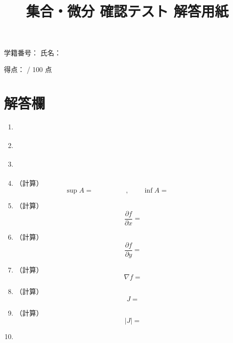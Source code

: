 \documentclass[uplatex,a4paper,12pt]{jsarticle}
\begin{document}
\title{集合・微分 確認テスト 解答用紙}
\author{}
\date{}
\maketitle

\noindent
学籍番号：\underline{\hspace{5cm}} \hfill
氏名：\underline{\hspace{5cm}}

\vspace{5mm}

\noindent
得点：\underline{\hspace{3cm}} / 100 点

\vspace{8mm}

\section*{解答欄}

\begin{enumerate}

\item \underline{\hspace{3cm}}

\vspace{7mm}

\item \underline{\hspace{3cm}}

\vspace{7mm}

\item \underline{\hspace{3cm}}

\vspace{7mm}

\item（計算）
\[
\sup A = \hspace{2cm}, \qquad \inf A = \hspace{2cm}
\]
\vspace{18mm}

\item（計算）
\[
\frac{\partial f}{\partial x} =
\]
\vspace{18mm}

\item（計算）
\[
\frac{\partial f}{\partial y} =
\]
\vspace{18mm}

\item（計算）
\[
\nabla f =
\]
\vspace{18mm}

\item（計算）
\[
J =
\]
\vspace{22mm}

\item（計算）
\[
|J| =
\]
\vspace{18mm}

\item \underline{\hspace{3cm}}

\end{enumerate}
\end{document}

